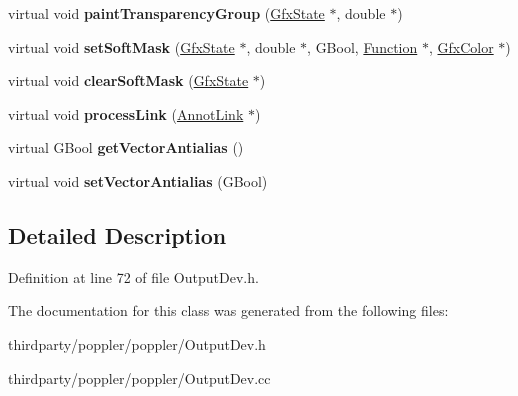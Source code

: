 \begin{DoxyCompactItemize}
virtual void {\bfseries paint\+Transparency\+Group} (\hyperlink{class_gfx_state}{Gfx\+State} $\ast$, double $\ast$)
\item 
\mbox{\label{class_output_dev_a34df49c454e5dd3d3ec841ef38e08199}} 
virtual void {\bfseries set\+Soft\+Mask} (\hyperlink{class_gfx_state}{Gfx\+State} $\ast$, double $\ast$, G\+Bool, \hyperlink{class_function}{Function} $\ast$, \hyperlink{struct_gfx_color}{Gfx\+Color} $\ast$)
\item 
\mbox{\label{class_output_dev_a0323fd4cd9bf7baed8f9f9cd155cfac1}} 
virtual void {\bfseries clear\+Soft\+Mask} (\hyperlink{class_gfx_state}{Gfx\+State} $\ast$)
\item 
\mbox{\label{class_output_dev_a9671ac2488c1b6109068bfafd7447f08}} 
virtual void {\bfseries process\+Link} (\hyperlink{class_annot_link}{Annot\+Link} $\ast$)
\item 
\mbox{\label{class_output_dev_aa3763793657e69a99f1a5b421184ed1c}} 
virtual G\+Bool {\bfseries get\+Vector\+Antialias} ()
\item 
\mbox{\label{class_output_dev_acfc60ae8c0873218a3c5d498bacaf11c}} 
virtual void {\bfseries set\+Vector\+Antialias} (G\+Bool)
\end{DoxyCompactItemize}


\subsection{Detailed Description}


Definition at line 72 of file Output\+Dev.\+h.



The documentation for this class was generated from the following files\+:\begin{DoxyCompactItemize}
\item 
thirdparty/poppler/poppler/Output\+Dev.\+h\item 
thirdparty/poppler/poppler/Output\+Dev.\+cc\end{DoxyCompactItemize}
